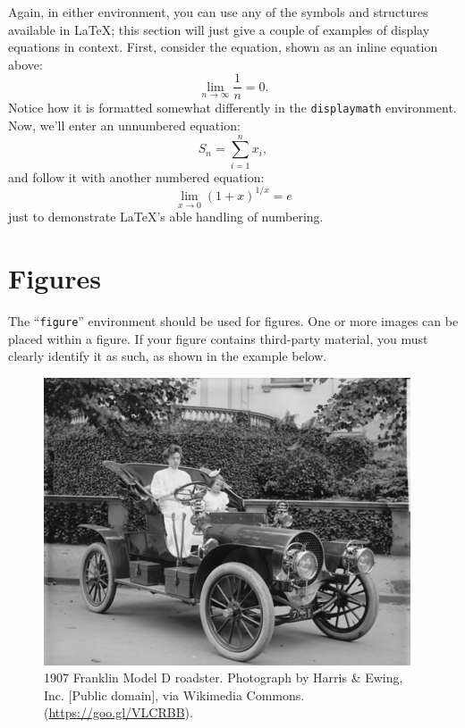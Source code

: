 \documentclass[
]{ceurart}
\begin{document}
Again, in either environment, you can use any of the symbols and
structures available in \LaTeX{}; this section will just give a couple
of examples of display equations in context.  First, consider the
equation, shown as an inline equation above:
\begin{equation}
  \lim_{n\rightarrow \infty} \frac{1}{n} = 0.
\end{equation}
Notice how it is formatted somewhat differently in
the \verb|displaymath|
environment.  Now, we'll enter an unnumbered equation:
\begin{displaymath}
  S_{n} = \sum_{i=1}^{n} x_{i} ,
\end{displaymath}
and follow it with another numbered equation:
\begin{equation}
  \lim_{x \to 0} (1 + x)^{1/x} = e
\end{equation}
just to demonstrate \LaTeX's able handling of numbering.

\section{Figures}

The ``\verb|figure|'' environment should be used for figures. One or
more images can be placed within a figure. If your figure contains
third-party material, you must clearly identify it as such, as shown
in the example below.
\begin{figure}
  \centering
  \includegraphics[width=\linewidth]{sample-franklin}
  \caption{1907 Franklin Model D roadster. Photograph by Harris \&
    Ewing, Inc. [Public domain], via Wikimedia
    Commons. (\url{https://goo.gl/VLCRBB}).}
\end{figure}
\end{document}
